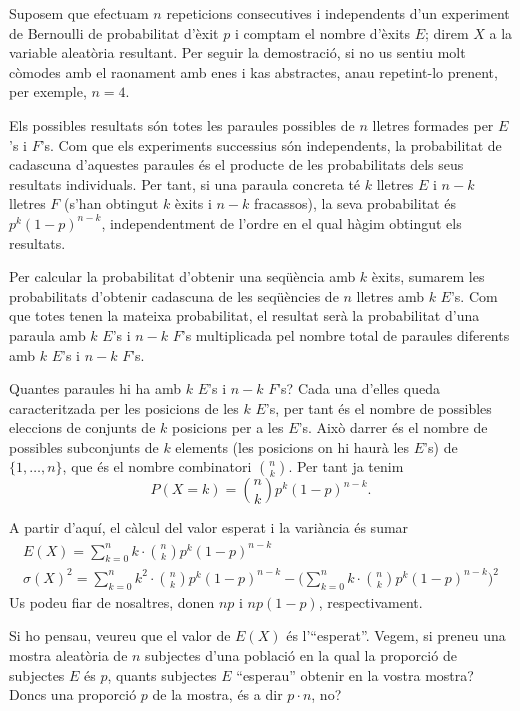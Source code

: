 \documentclass[
]{book}
\newenvironment{rmdblock}[1]
  {
  \begin{itemize}
  \renewcommand{\labelitemi}{
    \raisebox{-.7\height}[0pt][0pt]{
      {\setkeys{Gin}{width=3em,keepaspectratio}\texttt{[image: Bioestadística-II\_files/figure-html/\#1]}}
    }
  }
  \setlength{\fboxsep}{1em}
  \begin{kframe}
  \item
  }
  {
  \end{kframe}
  \end{itemize}
  }
\newenvironment{rmdcorbes}
  {\begin{rmdblock}{corbes}}
  {\end{rmdblock}}
\theoremstyle{definition}
\theoremstyle{definition}
\theoremstyle{definition}
\theoremstyle{remark}
\begin{document}
\begin{rmdcorbes}
Suposem que efectuam \(n\) repeticions consecutives i independents d'un experiment de Bernoulli de probabilitat d'èxit \(p\) i comptam el nombre d'èxits \(E\); direm \(X\) a la variable aleatòria resultant. Per seguir la demostració, si no us sentiu molt còmodes amb el raonament amb enes i kas abstractes, anau repetint-lo prenent, per exemple, \(n=4\).

Els possibles resultats són totes les paraules possibles de \(n\) lletres formades per \(E\)'s i \(F\)'s. Com que els experiments successius són independents, la probabilitat de cadascuna d'aquestes paraules és el producte de les probabilitats dels seus resultats individuals. Per tant, si una paraula concreta té \(k\) lletres \(E\) i \(n-k\) lletres \(F\) (s'han obtingut \(k\) èxits i \(n-k\) fracassos), la seva probabilitat és \(p^k(1-p)^{n-k}\), independentment de l'ordre en el qual hàgim obtingut els resultats.

Per calcular la probabilitat d'obtenir una seqüència amb \(k\) èxits, sumarem les probabilitats d'obtenir cadascuna de les seqüències de \(n\) lletres amb \(k\) \(E\)'s. Com que totes tenen la mateixa probabilitat, el resultat serà la probabilitat d'una paraula amb \(k\) \(E\)'s i \(n-k\) \(F\)'s multiplicada pel nombre total de paraules diferents amb \(k\) \(E\)'s i \(n-k\) \(F\)'s.

Quantes paraules hi ha amb \(k\) \(E\)'s i \(n-k\) \(F\)'s? Cada una d'elles queda caracteritzada per les posicions de les \(k\) \(E\)'s, per tant és el nombre de possibles eleccions de conjunts de \(k\) posicions per a les \(E\)'s. Això darrer és el nombre de possibles subconjunts de \(k\) elements (les posicions on hi haurà les \(E\)'s) de \(\{1,\ldots,n\}\), que és el nombre combinatori \(\binom{n}{k}\).
Per tant ja tenim
\[
P(X=k)=\binom{n}{k}p^k(1-p)^{n-k}.
\]

A partir d'aquí, el càlcul del valor esperat i la variància és sumar
\[
\begin{array}{l}
\displaystyle E(X)=\sum_{k=0}^n k\cdot \binom{n}{k}p^k(1-p)^{n-k}\\
\displaystyle \sigma(X)^2=\sum_{k=0}^n k^2\cdot \binom{n}{k}p^k(1-p)^{n-k}-\Big(\sum_{k=0}^n k\cdot \binom{n}{k}p^k(1-p)^{n-k})^2
\end{array}
\]
Us podeu fiar de nosaltres, donen \(np\) i \(np(1-p)\), respectivament.

Si ho pensau, veureu que el valor de \(E(X)\) és l'``esperat''. Vegem, si preneu una mostra aleatòria de \(n\) subjectes d'una població en la qual la proporció de subjectes \(E\) és \(p\), quants subjectes \(E\) ``esperau'' obtenir en la vostra mostra? Doncs una proporció \(p\) de la mostra, és a dir \(p\cdot n\), no?
\end{rmdcorbes}
\end{document}
